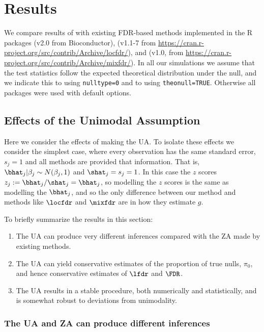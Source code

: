 \section*{Results}

We compare results of \ashr with existing FDR-based methods implemented
in the R packages \qvalue (v2.0 from Bioconductor), \locfdr (v1.1-7 from \url{https://cran.r-project.org/src/contrib/Archive/locfdr/}), and \mixfdr (v1.0, from \url{https://cran.r-project.org/src/contrib/Archive/mixfdr/}).  In all our simulations we assume that the test statistics follow the expected theoretical distribution under the null, and we indicate this
to \locfdr using {\tt nulltype=0} and to \mixfdr using {\tt theonull=TRUE}. Otherwise all packages were used with default options.

\subsection*{Effects of the Unimodal Assumption}

Here we consider the effects of making the UA. To isolate these effects we consider the simplest case, where every observation has the same
standard error, $s_j=1$ and all methods are provided that information. That is,
$\bhat_j | \beta_j \sim N(\beta_j,1)$ and $\shat_j=s_j=1$. In this case the $z$ scores $z_j:=\bhat_j/\shat_j=\bhat_j$, so modelling the $z$ scores is the same as modelling the $\bhat_j$, and so the only difference between our method and methods like $\locfdr$ and $\mixfdr$ are in how they estimate $g$.

To briefly summarize the results in this section:

\begin{enumerate}
\item The UA can produce very different inferences compared with the ZA made by existing methods.
\item The UA can yield conservative estimates of the proportion of true nulls, $\pi_0$, and hence conservative estimates of $\lfdr$ and $\FDR$.
\item The UA results in a stable procedure, both numerically and statistically, and is somewhat robust to deviations from unimodality.
\end{enumerate}

\subsubsection*{The UA and ZA can produce different inferences}